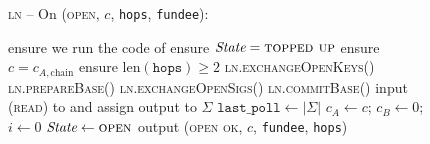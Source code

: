 \begin{figure}[H]
  \begin{processbox}{\textsc{ln} -- On (\textsc{open}, $c$, \texttt{hops},
  \texttt{fundee}):}
    \begin{algorithmic}[1]
      \State {}
      \label{code:ln:open:alice-open}
      \State ensure we run the code of \alice{} 
       
        \State ensure $\itistate = \textsc{topped up}$
        \State ensure $c = c_{A, \mathrm{chain}}$
      \Else \: 
        \State ensure $\mathrm{len}(\texttt{hops}) \geq 2$ 
      \EndIf
      \State \textsc{ln.exchangeOpenKeys}()
      \State \textsc{ln.prepareBase}()
      \State \textsc{ln.exchangeOpenSigs}()
        \State \textsc{ln.commitBase}()
      \EndIf
      \State input (\textsc{read}) to \ledger and assign output to $\Sigma$
      \State $\texttt{last\_poll} \gets |\Sigma|$
      \State $c_A \gets c$; $c_B \gets 0$; $i \gets 0$
      \State $\itistate \gets \textsc{open}$
      \label{code:ln:open:state-open}
      \State output (\textsc{open ok}, $c$, \texttt{fundee}, \texttt{hops})
    \end{algorithmic}
  \end{processbox}
  \caption{}
  \label{code:ln:open}
\end{figure}

